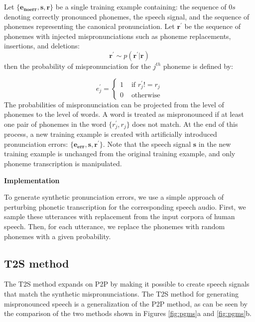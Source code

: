 \documentclass[]{interact}
\theoremstyle{plain}%
\theoremstyle{definition}
\theoremstyle{remark}
\begin{document}
Let $\{\mathbf{e_{noerr}}, \mathbf{s},\mathbf{r}\}$ be a single training example containing: the sequence of $0s$ denoting correctly pronounced phonemes, the speech signal, and the sequence of phonemes representing the canonical pronunciation.  Let $\mathbf{r^{'}}$ be the sequence of phonemes with injected mispronunciations such as phoneme replacements, insertions, and deletions:
\begin{equation}
\mathbf{r^{'}} \sim p(\mathbf{r^{'}}|\mathbf{r})
\end{equation}
then the probability of mispronunciation for the $j^{th}$ phoneme is defined by:

\begin{equation}
e_j^{'} = 
\left\{ 
  \begin{array}{rl}
     1 &\mbox{ if $r_j^{'} != r_j $} \\
     0 &\mbox{ otherwise}
   \end{array} 
 \right.
 \label{eqn:ptp_pron_error}
\end{equation}
The probabilities of mispronunciation can be projected from the level of phonemes to the level of words. A word is treated as mispronounced if at least one pair of phonemes in the word $\{r_j^{'},r_j\}$ does not match. At the end of this process, a new training example is created with artificially introduced pronunciation errors: $\{\mathbf{e_{err}}, \mathbf{s},\mathbf{r^{'}}\}$. Note that the speech signal $\mathbf{s}$ in the new training example is unchanged from the original training example, and only phoneme transcription is manipulated.

\bigskip

\textbf{Implementation}

\bigskip

To generate synthetic pronunciation errors, we use a simple approach of perturbing phonetic transcription for the corresponding speech audio.  First, we sample these utterances with replacement from the input corpora of human speech. Then, for each utterance, we replace the phonemes with random phonemes with a given probability. 

\subsection{T2S method}
\label{sec:t2s_method}

The T2S method expands on P2P by making it possible to create speech signals that match the synthetic mispronunciations. The T2S method for generating mispronounced speech is a generalization of the P2P method, as can be seen by the comparison of the two methods shown in Figures \ref{fig:pgms}a and \ref{fig:pgms}b.
\end{document}
